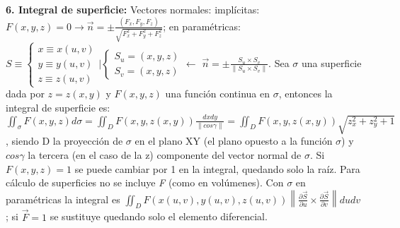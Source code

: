 \documentclass[a4paper, landscape, 11pt]{article}
\begin{document}
\textbf{6. Integral de superficie:} Vectores normales: implícitas: $F(x,y,z) = 0 \to \vec{n} = \pm \frac{(F_x, F_y, F_z)}{\sqrt{F_{x}^{2} + F_{y}^{2} + F_{z}^{2}}}$; en paramétricas: $S \equiv \left\{
\begin{array}{ll}
	x \equiv x(u,v) \\
	y \equiv y(u,v) \\
	z \equiv z(u,v)
\end{array} \right. \Bigg|
\left\{
\begin{array}{ll}
S_u = (x,y,z) \\
S_v = (x,y,z)
\end{array} \right. \leftarrow$
$ \vec{n} = \pm \frac{S_u \times S_v}{\|S_u \times S_v \|}$. Sea $\sigma$ una superficie dada por $z = z(x,y)$ y $F(x,y,z)$ una función continua en $\sigma$, entonces la integral de superficie es: $\iint_{\sigma} F(x,y,z) d\sigma = \iint_{D} F(x,y,z(x,y)) \frac{dxdy}{\| cos \gamma \|} = \iint_{D} F(x,y,z(x,y)) \sqrt{z_{x}^{2} + z_{y}^2 + 1}$, siendo D la proyección de $\sigma$ en el plano XY (el plano opuesto a la función $\sigma$) y $cos \gamma$ la tercera (en el caso de la z) componente del vector normal de $\sigma$. Si $F(x,y,z) = 1$ se puede cambiar por 1 en la integral, quedando solo la raíz. Para cálculo de superficies no se incluye \textit{F} (como en volúmenes). Con $\sigma$ en paramétricas la integral es $\iint_{D} F(x(u,v), y(u,v), z(u,v)) \left\|\frac{\partial \vec{S}}{\partial u} \times \frac{\partial \vec{S}}{\partial v} \right\| du dv$; si $\vec{F} = 1$ se sustituye quedando solo el elemento diferencial.
\\
\end{document}
